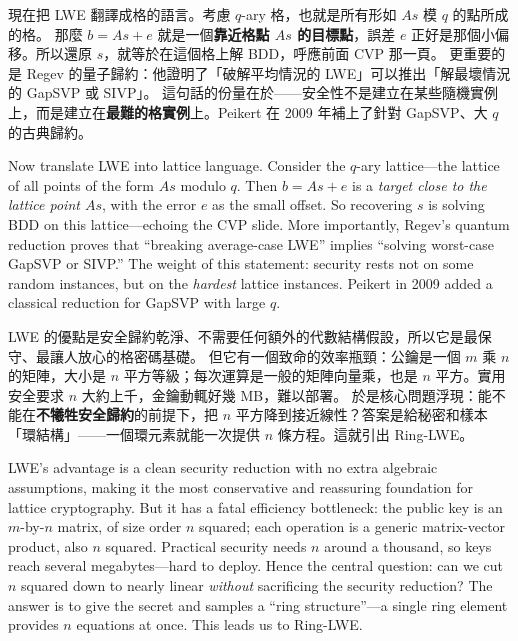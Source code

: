 \documentclass[10.5pt, a4paper]{article}
\newcommand{\slide}[2]{%
  \vspace{2pt}%
  \noindent{\small\bfseries\color{accent} ◆ 第 #1 頁\;|\;#2}\par\vspace{1pt}%
}
\newenvironment{zh}{%
  \begin{tcolorbox}[colback=zhfill, colframe=accent!45, breakable,
    left=5pt, right=5pt, top=2.5pt, bottom=2.5pt, boxrule=0.4pt,
    title={\footnotesize\bfseries 中文口語}, fonttitle=\color{white},
    coltitle=white, colbacktitle=accent]\small
}{\end{tcolorbox}\vspace{-1pt}}
\newenvironment{en}{%
  \begin{tcolorbox}[colback=enfill, colframe=engreen!45, breakable,
    left=5pt, right=5pt, top=2.5pt, bottom=2.5pt, boxrule=0.4pt,
    title={\footnotesize\bfseries English Script}, fonttitle=\color{white},
    coltitle=white, colbacktitle=engreen]\small\itshape
}{\end{tcolorbox}\vspace{1pt}}
\begin{document}
\slide{11}{LWE：與格的連結與安全歸約}
\begin{zh}
現在把 LWE 翻譯成格的語言。考慮 $q$-ary 格，也就是所有形如 $As$ 模 $q$ 的點所成的格。
那麼 $b = As + e$ 就是一個\textbf{靠近格點 $As$ 的目標點}，誤差 $e$ 正好是那個小偏移。所以還原 $s$，就等於在這個格上解 BDD，呼應前面 CVP 那一頁。
更重要的是 Regev 的量子歸約：他證明了「破解平均情況的 LWE」可以推出「解最壞情況的 GapSVP 或 SIVP」。
這句話的份量在於——安全性不是建立在某些隨機實例上，而是建立在\textbf{最難的格實例}上。Peikert 在 2009 年補上了針對 GapSVP、大 $q$ 的古典歸約。
\end{zh}
\begin{en}
Now translate LWE into lattice language. Consider the $q$-ary lattice—the lattice of all points of the form $As$ modulo $q$.
Then $b = As + e$ is a \emph{target close to the lattice point $As$}, with the error $e$ as the small offset. So recovering $s$ is solving BDD on this lattice—echoing the CVP slide.
More importantly, Regev's quantum reduction proves that ``breaking average-case LWE'' implies ``solving worst-case GapSVP or SIVP.''
The weight of this statement: security rests not on some random instances, but on the \emph{hardest} lattice instances. Peikert in 2009 added a classical reduction for GapSVP with large $q$.
\end{en}

\slide{12}{LWE：困難性與效率瓶頸}
\begin{zh}
LWE 的優點是安全歸約乾淨、不需要任何額外的代數結構假設，所以它是最保守、最讓人放心的格密碼基礎。
但它有一個致命的效率瓶頸：公鑰是一個 $m$ 乘 $n$ 的矩陣，大小是 $n$ 平方等級；每次運算是一般的矩陣向量乘，也是 $n$ 平方。實用安全要求 $n$ 大約上千，金鑰動輒好幾 MB，難以部署。
於是核心問題浮現：能不能在\textbf{不犧牲安全歸約}的前提下，把 $n$ 平方降到接近線性？答案是給秘密和樣本「環結構」——一個環元素就能一次提供 $n$ 條方程。這就引出 Ring-LWE。
\end{zh}
\begin{en}
LWE's advantage is a clean security reduction with no extra algebraic assumptions, making it the most conservative and reassuring foundation for lattice cryptography.
But it has a fatal efficiency bottleneck: the public key is an $m$-by-$n$ matrix, of size order $n$ squared; each operation is a generic matrix-vector product, also $n$ squared. Practical security needs $n$ around a thousand, so keys reach several megabytes—hard to deploy.
Hence the central question: can we cut $n$ squared down to nearly linear \emph{without} sacrificing the security reduction? The answer is to give the secret and samples a ``ring structure''—a single ring element provides $n$ equations at once. This leads us to Ring-LWE.
\end{en}
\end{document}
